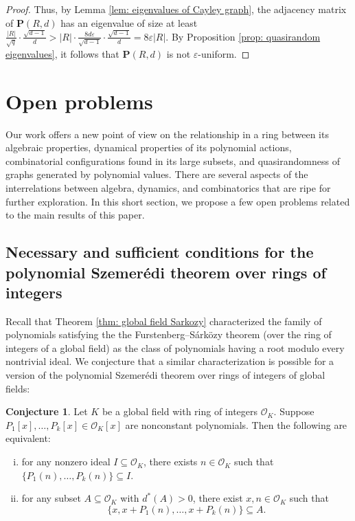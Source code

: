 \documentclass{amsart}
\theoremstyle{definition}
\newtheorem{conjecture}[theorem]{Conjecture}
\numberwithin{equation}{section}
\newcommand{\bfP}{\mathbf{P}}
\newcommand{\mO}{\mathcal{O}}
\newcommand{\eps}{\varepsilon}
\begin{document}
\begin{proof}
    Thus, by Lemma \ref{lem: eigenvalues of Cayley graph}, the adjacency matrix of $\bfP(R,d)$ has an eigenvalue of size at least $\frac{|R|}{\sqrt{q}} \cdot \frac{\sqrt{d-1}}{d} > |R| \cdot \frac{8d\eps}{\sqrt{d-1}} \cdot \frac{\sqrt{d-1}}{d} = 8\eps|R|$.
    By Proposition \ref{prop: quasirandom eigenvalues}, it follows that $\bfP(R,d)$ is not $\eps$-uniform.
\end{proof}


\section{Open problems} \label{sec: open problems}

Our work offers a new point of view on the relationship in a ring between its algebraic properties, dynamical properties of its polynomial actions, combinatorial configurations found in its large subsets, and quasirandomness of graphs generated by polynomial values.
There are several aspects of the interrelations between algebra, dynamics, and combinatorics that are ripe for further exploration.
In this short section, we propose a few open problems related to the main results of this paper.


\subsection{Necessary and sufficient conditions for the polynomial Szemer\'{e}di theorem over rings of integers}

Recall that Theorem \ref{thm: global field Sarkozy} characterized the family of polynomials satisfying the the Furstenberg--S\'{a}rk\"{o}zy theorem (over the ring of integers of a global field) as the class of polynomials having a root modulo every nontrivial ideal.
We conjecture that a similar characterization is possible for a version of the polynomial Szemer\'{e}di theorem over rings of integers of global fields:

\begin{conjecture} \label{conj: nec, suff pSz}
    Let $K$ be a global field with ring of integers $\mO_K$.
    Suppose $P_1[x], \dots, P_k[x] \in \mO_K[x]$ are nonconstant polynomials.
    Then the following are equivalent:
    \begin{enumerate}[(i)]
        \item for any nonzero ideal $I \subseteq \mO_K$, there exists $n \in \mO_K$ such that $\{P_1(n), \dots, P_k(n)\} \subseteq I$.
        \item for any subset $A \subseteq \mO_K$ with $d^*(A) > 0$, there exist $x, n \in \mO_K$ such that
        \begin{equation*}
            \{x, x+P_1(n), \dots, x+P_k(n)\} \subseteq A.
        \end{equation*}
    \end{enumerate}
\end{conjecture}
\end{document}
